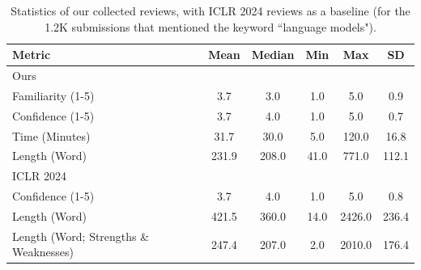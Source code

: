 







\begin{table}[t]
\centering
\small 
\begin{tabular}{l c c c c c} 
 \hline
 Metric & Mean & Median & Min & Max & SD \\ 
 \hline
 Ours \\
Familiarity (1-5) & 3.7 & 3.0 & 1.0 & 5.0 & 0.9 \\
Confidence (1-5) & 3.7 & 4.0 & 1.0 & 5.0 & 0.7 \\
Time (Minutes) & 31.7 & 30.0 & 5.0 & 120.0 & 16.8 \\
Length (Word) & 231.9 & 208.0 & 41.0 & 771.0 & 112.1 \\ 
\hline 
ICLR 2024 \\
Confidence (1-5) & 3.7 & 4.0 & 1.0 & 5.0 & 0.8 \\
Length (Word) & 421.5 & 360.0 & 14.0 & 2426.0 & 236.4 \\ 
Length (Word; Strengths \& Weaknesses) & 247.4 & 207.0 & 2.0 & 2010.0 & 176.4 \\
 \hline
\end{tabular}
\caption{Statistics of our collected reviews, with ICLR 2024 reviews as a baseline (for the 1.2K submissions that mentioned the keyword ``language models").}
\label{table:review_stats}
\end{table}






